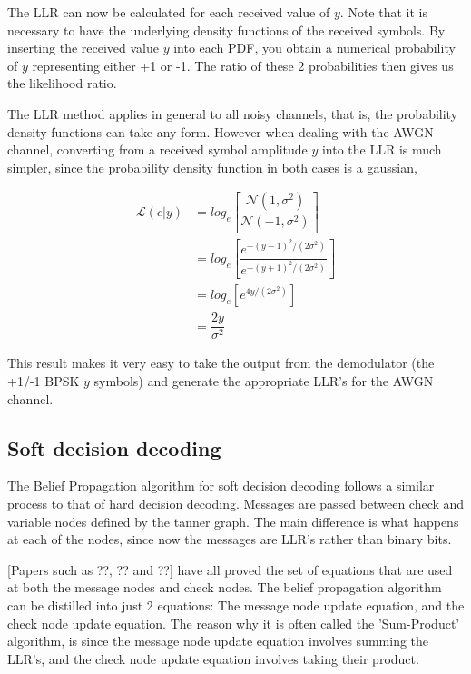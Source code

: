 \documentclass[11pt]{article}
\numberwithin{equation}{subsection}
\begin{document}
\noindent The LLR can now be calculated for each received value of $y$. Note that it is necessary to have the underlying density functions of the received symbols. By inserting the received value $y$ into each PDF, you obtain a numerical probability of $y$ representing either +1 or -1. The ratio of these 2 probabilities then gives us the likelihood ratio.

The LLR method applies in general to all noisy channels, that is, the probability density functions can take any form. However when dealing with the AWGN channel, converting from a received symbol amplitude $y$ into the LLR is much simpler, since the probability density function in both cases is a gaussian,

\begin{equation} \label{eq:LLR_awgn}
\begin{aligned}
\mathcal{L}(c|y) &= log_e \left[ \dfrac{\mathcal{N}(1,\sigma^2)} {\mathcal{N}(-1,\sigma^2)} \right] 
\\
&= log_e \left[ \dfrac{e^{-(y-1)^2/(2\sigma^2)}}{e^{-(y+1)^2/(2\sigma^2)}} \right]
\\
&= log_e \left[ e^{4y/(2\sigma^2)} \right]
\\
&= \dfrac{2y}{\sigma^2}
\end{aligned}
\end{equation}

\noindent This result makes it very easy to take the output from the demodulator (the +1/-1 BPSK $y$ symbols) and generate the appropriate LLR's for the AWGN channel.

\subsection{Soft decision decoding}
The Belief Propagation algorithm for soft decision decoding follows a similar process to that of hard decision decoding. Messages are passed between check and variable nodes defined by the tanner graph. The main difference is what happens at each of the nodes, since now the messages are LLR's rather than binary bits. 

[Papers such as ??, ?? and ??] have all proved the set of equations that are used at both the message nodes and check nodes. The belief propagation algorithm can be distilled into just 2 equations: The message node update equation, and the check node update equation. The reason why it is often called the 'Sum-Product' algorithm, is since the message node update equation involves summing the LLR's, and the check node update equation involves taking their product.
\end{document}
